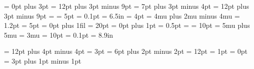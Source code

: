 \abovedisplayshortskip =   0pt plus 3pt
\abovedisplayskip      =  12pt plus 3pt minus 9pt
\belowdisplayshortskip =   7pt plus 3pt minus 4pt
\belowdisplayskip      =  12pt plus 3pt minus 9pt
\boxmaxdepth           = \maxdimen
\delimitershortfall    =   5pt
\hfuzz                 = 0.1pt
\hsize                 = 6.5in
\maxdepth              =   4pt
\medmuskip             =   4mu plus 2mu minus 4mu
\nulldelimiterspace    = 1.2pt
\overfullrule          =   5pt
\parfillskip           =   0pt plus 1fil
\parindent             =  20pt
\parskip               =   0pt plus 1pt
\scriptspace           = 0.5pt
\splitmaxdepth         = \maxdimen
\splittopskip          =  10pt
\thickmuskip           =   5mu plus 5mu
\thinmuskip            =   3mu
\topskip               =  10pt
\vfuzz                 = 0.1pt
\vsize                 = 8.9in


\newskip  \bigskipamount
\newdimen \jot
\newskip  \medskipamount
\newskip  \normalbaselineskip
\newskip  \normallineskip
\newdimen \normallineskiplimit
\newskip  \smallskipamount

\bigskipamount       = 12pt plus 4pt minus 4pt
\jot                 =  3pt
\medskipamount       =  6pt plus 2pt minus 2pt
\normalbaselineskip  = 12pt
\normallineskip      =  1pt
\normallineskiplimit =  0pt
\smallskipamount     =  3pt plus 1pt minus 1pt


\def\lq{`}
\def\rq{'}

\def\lbrack{[}
\def\rbrack{]}

\let\endgraf=\par
\let\endline=\cr

\def\space{ }
\def\empty{}
\def\null {\hbox{}}


\long{}

